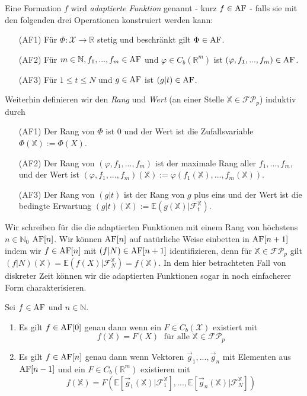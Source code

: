 
\begin{definition}
Eine Formation $f$ wird \emph{adaptierte Funktion} genannt - kurz $f \in \operatorname{AF}$ - falls sie mit den folgenden drei Operationen konstruiert werden kann:
\begin{enumerate}
    \item[(AF1)] Für $\Phi: \mathcal{X} \rightarrow \mathbb{R}$ stetig und beschränkt gilt $\Phi \in \operatorname{AF}$.
    \item[(AF2)] Für $m \in \mathbb{N}, f_1,...,f_m \in \operatorname{AF}$ und $\varphi \in C_b(\mathbb{R}^m)$ ist $(\varphi, f_1, ..., f_m) \in \operatorname{AF}$.
    \item[(AF3)] Für $1\leq t \leq N$ und $g \in \operatorname{AF}$ ist $(g \vert t) \in \operatorname{AF}$.
\end{enumerate}
Weiterhin definieren wir den \emph{Rang} und \emph{Wert} (an einer Stelle $\mathbb{X} \in \mathcal{FP}_p$) induktiv durch 
\begin{enumerate}
    \item[(AF1)] Der Rang von $\Phi$ ist $0$ und der Wert ist die Zufallsvariable $\Phi(\mathbb{X}):=\Phi(X)$.
    \item[(AF2)] Der Rang von $(\varphi, f_1,...,f_m)$ ist der maximale Rang aller $f_1,...,f_m$, und der Wert ist $(\varphi, f_1,...,f_m)(\mathbb{X}):=\varphi(f_1(\mathbb{X}), ..., f_m(\mathbb{X}))$.
    \item[(AF3)] Der Rang von $(g \vert t)$ ist der Rang von $g$ plus eins und der Wert ist die bedingte Erwartung $(g\vert t)(\mathbb{X}) := \mathbb{E}(g(\mathbb{X}) \vert \mathcal{F}_t^\mathbb{X})$.
\end{enumerate}
\end{definition}
Wir schreiben für die die adaptierten Funktionen mit einem Rang von höchstens $n \in \mathbb{N}_0$ $\operatorname{AF}[n]$. Wir können $\operatorname{AF}[n]$ auf natürliche Weise einbetten in $\operatorname{AF}[n+1]$ indem wir $f \in \operatorname{AF}[n]$ mit $(f \vert N) \in \operatorname{AF}[n+1]$ identifizieren, denn für $\mathbb{X} \in \mathcal{FP}_p$ gilt $(f \vert N)(\mathbb{X}) = \mathbb{E}(f(X) \vert \mathcal{F}_N^\mathbb{X}) = f(\mathbb{X})$. In dem hier betrachteten Fall von diskreter Zeit können wir die adaptierten Funktionen sogar in noch einfacherer Form charakterisieren.
\begin{lemma}
Sei $f \in \operatorname{AF}$ und $n \in \mathbb{N}$. 
\begin{enumerate}
    \item Es gilt $f \in \operatorname{AF}[0]$ genau dann wenn ein $F \in C_b(\mathcal{X})$ existiert mit 
    $$f(\mathbb{X}) = F(X)\; \text{ für alle } \mathbb{X} \in \mathcal{FP}_p$$ 
    \item Es gilt $f \in \operatorname{AF}[n]$ genau dann wenn Vektoren $\vec{g}_1,...,\vec{g}_n$ mit Elementen aus $\operatorname{AF}[n-1]$ und ein $F \in C_b(\mathbb{R}^m)$ existieren mit 
    $$f(\mathbb{X}) = F(\mathbb{E}[\vec{g}_1(\mathbb{X}) \vert \mathcal{F}_1^\mathbb{X}], ..., \mathbb{E}[\vec{g}_n(\mathbb{X}) \vert \mathcal{F}_N^{\mathbb{X}}])$$
\end{enumerate}
\end{lemma}
